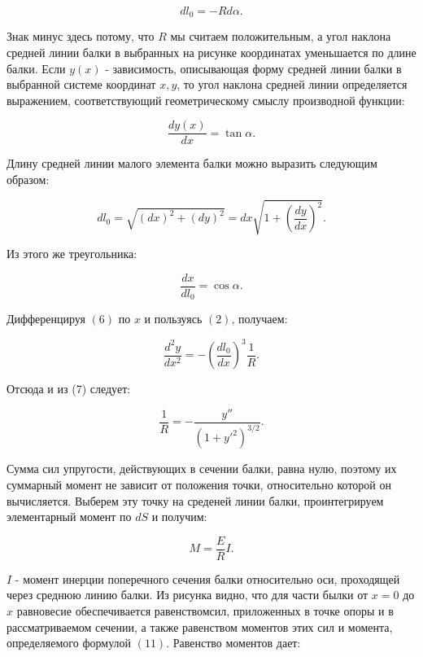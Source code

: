 \documentclass[a4paper,12pt]{report}
\begin{document}
\begin{equation}
	dl_0=-Rd\alpha.
	\label{form5}
\end{equation}

Знак минус здесь потому, что $R$ мы считаем положительным, а угол наклона средней линии балки в выбранных на рисунке координатах уменьшается по длине балки. Если $y(x)$ - зависимость, описывающая форму средней линии балки в выбранной системе координат $x,y$, то угол наклона средней линии определяется выражением, соответствующий геометрическому смыслу производной функции:

\begin{equation}
	\frac{dy(x)}{dx}=\tan{\alpha}.
	\label{form6}
\end{equation}

Длину средней линии малого элемента балки можно выразить следующим образом:

\begin{equation}
	dl_0=\sqrt{(dx)^2+(dy)^2}=dx \sqrt{1+(\frac{dy}{dx})^2}.
	\label{form7}
\end{equation}

Из этого же треугольника:

\begin{equation}
	\frac{dx}{dl_0}=\cos{\alpha}.
	\label{form8}
\end{equation}

Дифференцируя $(6)$ по $x$ и пользуясь $(2)$, получаем:

\begin{equation}
	\frac{d^2y}{dx^2}=-(\frac{dl_0}{dx})^3\frac{1}{R}.
	\label{form9}
\end{equation} 

Отсюда и из (7) следует:

\begin{equation}
	\frac{1}{R}=-\frac{y''}{(1+y'^2)^{3/2}}.
	\label{form10}
\end{equation}

Сумма сил упругости, действующих в сечении балки, равна нулю, поэтому их суммарный момент не зависит от положения точки, относительно которой он вычисляется. Выберем эту точку на среденей линии балки, проинтегрируем элементарный момент по $dS$ и получим:

\begin{equation}
	M = \frac{E}{R} I.
	\label{form11}
\end{equation}

$I$ - момент инерции поперечного сечения балки относительно оси, проходящей через среднюю линию балки. Из рисунка видно, что для части былки от $x=0$ до $x$ равновесие обеспечивается равенствомсил, приложенных в точке опоры и в рассматриваемом сечении, а также равенством моментов этих сил и момента, определяемого формулой $(11)$.
Равенство моментов дает:
\end{document}
